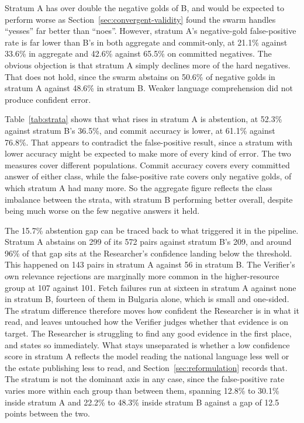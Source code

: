 Stratum A has over double the negative golds of B, and would be expected to perform worse as Section~\ref{sec:convergent-validity} found the swarm handles ``yesses'' far better than ``noes''. However, stratum A's negative-gold false-positive rate is far lower than B's in both aggregate and commit-only, at 21.1\% against 33.6\% in aggregate and 42.6\% against 65.5\% on committed negatives. The obvious objection is that stratum A simply declines more of the hard negatives. That does not hold, since the swarm abstains on 50.6\% of negative golds in stratum A against 48.6\% in stratum B. Weaker language comprehension did not produce confident error.

Table~\ref{tab:strata} shows that what rises in stratum A is abstention, at 52.3\% against stratum B's 36.5\%, and commit accuracy is lower, at 61.1\% against 76.8\%. That appears to contradict the false-positive result, since a stratum with lower accuracy might be expected to make more of every kind of error. The two measures cover different populations. Commit accuracy covers every committed answer of either class, while the false-positive rate covers only negative golds, of which stratum A had many more. So the aggregate figure reflects the class imbalance between the strata, with stratum B performing better overall, despite being much worse on the few negative answers it held.

The 15.7\% abstention gap can be traced back to what triggered it in the pipeline. Stratum A abstains on 299 of its 572 pairs against stratum B's 209, and around 96\% of that gap sits at the Researcher's confidence landing below the threshold. This happened on 143 pairs in stratum A against 56 in stratum B. The Verifier's own relevance rejections are marginally more common in the higher-resource group at 107 against 101. Fetch failures run at sixteen in stratum A against none in stratum B, fourteen of them in Bulgaria alone, which is small and one-sided. The stratum difference therefore moves how confident the Researcher is in what it read, and leaves untouched how the Verifier judges whether that evidence is on target. The Researcher is struggling to find any good evidence in the first place, and states so immediately. What stays unseparated is whether a low confidence score in stratum A reflects the model reading the national language less well or the estate publishing less to read, and Section~\ref{sec:reformulation} records that. The stratum is not the dominant axis in any case, since the false-positive rate varies more within each group than between them, spanning 12.8\% to 30.1\% inside stratum A and 22.2\% to 48.3\% inside stratum B against a gap of 12.5 points between the two.



